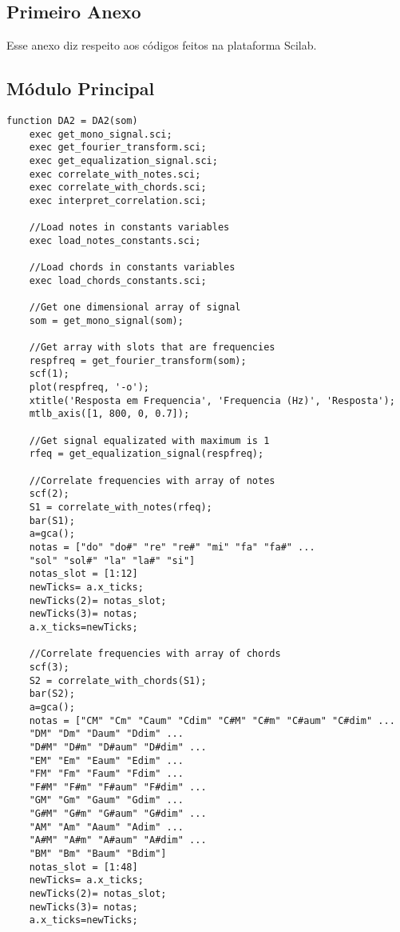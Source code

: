 \begin{anexosenv}

\partanexos

\chapter{Primeiro Anexo}

Esse anexo diz respeito aos códigos feitos na plataforma Scilab.

\section{Módulo Principal}
\label{sec:moduloprincipal}
\begin{lstlisting} 
function DA2 = DA2(som)
	exec get_mono_signal.sci;
	exec get_fourier_transform.sci;
	exec get_equalization_signal.sci;
	exec correlate_with_notes.sci;
	exec correlate_with_chords.sci;
	exec interpret_correlation.sci;

	//Load notes in constants variables
	exec load_notes_constants.sci;

	//Load chords in constants variables
	exec load_chords_constants.sci;

	//Get one dimensional array of signal 
	som = get_mono_signal(som);

	//Get array with slots that are frequencies 
	respfreq = get_fourier_transform(som);
	scf(1); 
	plot(respfreq, '-o');
	xtitle('Resposta em Frequencia', 'Frequencia (Hz)', 'Resposta');
	mtlb_axis([1, 800, 0, 0.7]);

	//Get signal equalizated with maximum is 1
	rfeq = get_equalization_signal(respfreq);

	//Correlate frequencies with array of notes
	scf(2);
	S1 = correlate_with_notes(rfeq);
	bar(S1);
	a=gca();
	notas = ["do" "do#" "re" "re#" "mi" "fa" "fa#" ...
	"sol" "sol#" "la" "la#" "si"]
	notas_slot = [1:12]
	newTicks= a.x_ticks;
	newTicks(2)= notas_slot;
	newTicks(3)= notas;
	a.x_ticks=newTicks;

	//Correlate frequencies with array of chords
	scf(3);
	S2 = correlate_with_chords(S1);
	bar(S2);
	a=gca();
	notas = ["CM" "Cm" "Caum" "Cdim" "C#M" "C#m" "C#aum" "C#dim" ...
	"DM" "Dm" "Daum" "Ddim" ... 
	"D#M" "D#m" "D#aum" "D#dim" ... 
	"EM" "Em" "Eaum" "Edim" ... 
	"FM" "Fm" "Faum" "Fdim" ... 
	"F#M" "F#m" "F#aum" "F#dim" ...
	"GM" "Gm" "Gaum" "Gdim" ...
	"G#M" "G#m" "G#aum" "G#dim" ...
	"AM" "Am" "Aaum" "Adim" ... 
	"A#M" "A#m" "A#aum" "A#dim" ... 
	"BM" "Bm" "Baum" "Bdim"]
	notas_slot = [1:48]
	newTicks= a.x_ticks;
	newTicks(2)= notas_slot;
	newTicks(3)= notas;
	a.x_ticks=newTicks;


\end{lstlisting}
\end{anexosenv}
